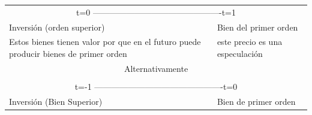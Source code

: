 \begin{center}
\begin{tabular}{ | p{5cm}  p{5cm} |  }
    \multicolumn{2}{|c|}{t=0 ----------------------------------------------t=1}   \\ 
    Inversión (orden superior)&  Bien del primer orden \\ 
    Estos bienes tienen valor por que en el futuro puede producir bienes de primer orden & este precio es una especulación\\ 
    \multicolumn{2}{|c|}{Alternativamente} \\ 
    \\
    \multicolumn{2}{|c|}{t=-1 ----------------------------------------------t=0} \\ 
    Inversión (Bien Superior) & Bien de primer orden \\ 
\end{tabular}
\end{center}

